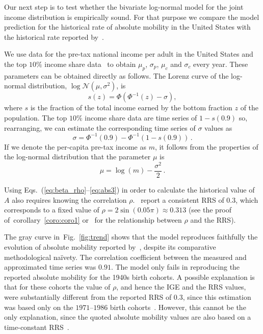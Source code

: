 \documentclass[12pt,a4paper]{article}
\newcommand{\creflong}[1]{corollary~\ref{coro:#1}}
\newcommand{\fref}[1]{Fig.~\ref{fig:#1}}
\newcommand{\be}{\begin{equation}}
\newcommand{\ee}{\end{equation}}
\numberwithin{equation}{section}
\begin{document}
Our next step is to test whether the bivariate log-normal model for the joint income distribution is empirically sound. For that purpose we compare the model prediction for the historical rate of absolute mobility in the United States with the historical rate reported by~\citet{chetty2017fading}.

We use data for the pre-tax national income per adult in the United States and the top $10\%$ income share data~\citep{WID2017} to obtain $\mu_p$, $\sigma_p$, $\mu_c$ and $\sigma_c$ every year. These parameters can be obtained directly as follows. The Lorenz curve of the log-normal distribution, $\log{\mathcal{N}}\left(\mu,\sigma^2\right)$, is~~\citep{cowell2011measuring}
\be
s(z) = \Phi\left(\Phi^{-1}\left(z\right)-\sigma\right),
\ee
where $s$ is the fraction of the total income earned by the bottom fraction $z$ of the population. The top $10\%$ income share data are time series of $1-s(0.9)$ so, rearranging, we can estimate the corresponding time series of $\sigma$ values as
\be
\sigma = \Phi^{-1}\left(0.9\right) - \Phi^{-1}\left(1-s(0.9)\right)\,.
\ee
If we denote the per-capita pre-tax income as $m$, it follows from the properties of the log-normal distribution that the parameter $\mu$ is
\be
\mu = \log{\left(m\right)} - \frac{\sigma^2}{2}\,.
\ee

Using Eqs.~(\ref{eq:beta_rho}--\ref{eq:abs3}) in order to calculate the historical value of $A$ also requires knowing the correlation $\rho$.~\citet{chetty2014united} report a consistent RRS of $0.3$, which corresponds to a fixed value of $\rho=2\sin{\left(0.05\pi\right)}\approx0.313$ (see the proof of~\creflong{coro1} or~\citet{trivedi2007copula} for the relationship between $\rho$ and the RRS).

The gray curve in~\fref{trend} shows that the model reproduces faithfully the evolution of absolute mobility reported by~\citet{chetty2017fading}, despite its comparative methodological na\"{i}vety. The correlation coefficient between the measured and approximated time series was $0.91$. The model only fails in reproducing the reported absolute mobility for the 1940s birth cohorts. A possible explanation is that for these cohorts the value of $\rho$, and hence the IGE and the RRS values, were substantially different from the reported RRS of $0.3$, since this estimation was based only on the $1971$--$1986$ birth cohorts~\citep{chetty2014united}. However, this cannot be the only explanation, since the quoted absolute mobility values are also based on a time-constant RRS~\citep{chetty2017fading}.
\end{document}
